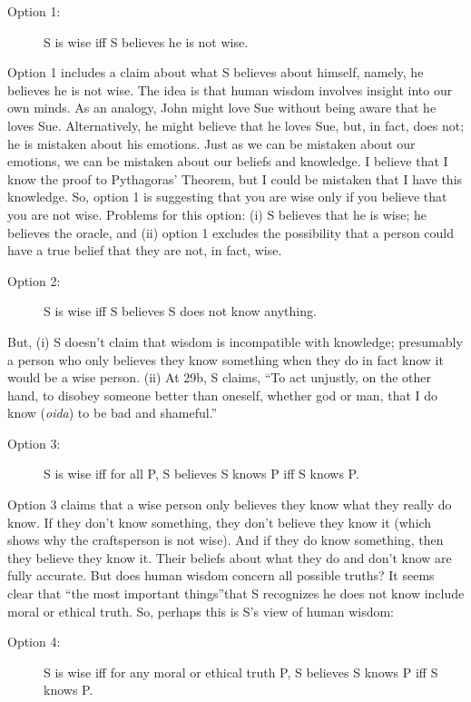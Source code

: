 \documentclass[oneside]{article}
\begin{document}
\begin{description}
\item[Option 1:] S is wise iff S believes he is not wise.
\end{description}
Option 1 includes a claim about what S believes about himself, namely, he believes he is not wise. The idea is that human wisdom involves insight into our own minds. As an analogy, John might love Sue without being aware that he loves Sue. Alternatively, he might believe that he loves Sue, but, in fact, does not; he is mistaken about his emotions. Just as we can be mistaken about our emotions, we can be mistaken about our beliefs and knowledge. I believe that I know the proof to Pythagoras' Theorem, but I could be mistaken that I have this knowledge. So, option 1 is suggesting that you are wise only if you believe that you are not wise. 
Problems for this option:  (i) S believes that he is wise; he believes the oracle, and (ii) option 1 excludes the possibility that a person could have a true belief that they are not, in fact, wise. 
\begin{description}
\item[Option 2:] S is wise iff S believes S does not know anything.
\end{description}
But, (i) S doesn't claim that wisdom is incompatible with knowledge; presumably a person who only believes they know something when they do in fact know it would be a wise person. (ii) At 29b, S claims, ``To act unjustly, on the other hand, to disobey someone better than oneself, whether god or man, that I do know (\emph{oida}) to be bad and shameful.''  
\begin{description}
\item[Option 3:] S is wise iff for all P, S believes S knows P iff S knows P.
\end{description}
Option 3 claims that a wise person only believes they know what they really do know. If they don't know something, they don't believe they know it (which shows why the craftsperson is not wise). And if they do know something, then they believe they know it. Their beliefs about what they do and don't know are fully accurate. But does human wisdom concern all possible truths? It seems clear that ``the most important things''that S recognizes he does not know include moral or ethical truth. So, perhaps this is S's view of human wisdom: 
\begin{description}
\item[Option 4:] S is wise iff for any moral or ethical truth P, S believes S knows P iff S knows P.
\end{description}
\end{document}
